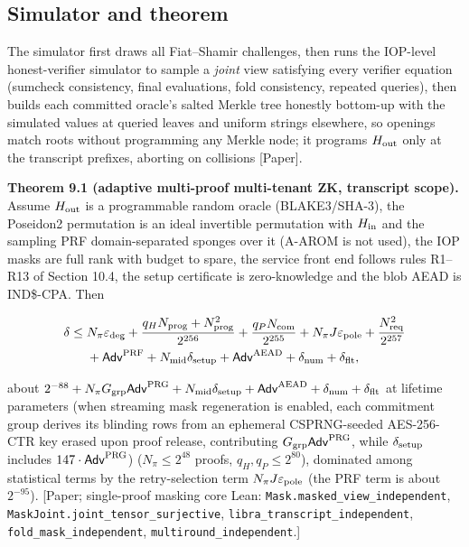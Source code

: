 \documentclass[10pt]{article}
\begin{document}
\subsection{Simulator and theorem}
The simulator first draws all Fiat--Shamir challenges, then runs the IOP-level honest-verifier simulator to sample a \emph{joint} view satisfying every verifier equation (sumcheck consistency, final evaluations, fold consistency, repeated queries), then builds each committed oracle's salted Merkle tree honestly bottom-up with the simulated values at queried leaves and uniform strings elsewhere, so openings match roots without programming any Merkle node; it programs $H_{\rm out}$ only at the transcript prefixes, aborting on collisions [Paper].

\textbf{Theorem 9.1 (adaptive multi-proof multi-tenant ZK, transcript scope).} Assume $H_{\rm out}$ is a programmable random oracle (BLAKE3/SHA-3), the Poseidon2 permutation is an ideal invertible permutation with $H_{\rm in}$ and the sampling PRF domain-separated sponges over it (A-AROM is not used), the IOP masks are full rank with budget to spare, the service front end follows rules R1--R13 of Section 10.4, the setup certificate is zero-knowledge and the blob AEAD is IND\$-CPA. Then

\[\begin{aligned}\delta\le{}&N_\pi\varepsilon_{\rm deg}+\frac{q_HN_{\rm prog}+N_{\rm prog}^2}{2^{256}}+\frac{q_PN_{\rm com}}{2^{255}}+N_\pi J\varepsilon_{\rm pole}+\frac{N_{\rm req}^2}{2^{257}}\\&+\mathsf{Adv}^{\rm PRF}+N_{\rm mid}\delta_{\rm setup}+\mathsf{Adv}^{\rm AEAD}+\delta_{\rm num}+\delta_{\rm flt},\end{aligned}\]

about $2^{-88}+N_\pi G_{\rm grp}\mathsf{Adv}^{\rm PRG}+N_{\rm mid}\delta_{\rm setup}+\mathsf{Adv}^{\rm AEAD}+\delta_{\rm num}+\delta_{\rm flt}$ at lifetime parameters (when streaming mask regeneration is enabled, each commitment group derives its blinding rows from an ephemeral CSPRNG-seeded AES-256-CTR key erased upon proof release, contributing $G_{\rm grp}\mathsf{Adv}^{\rm PRG}$, while $\delta_{\rm setup}$ includes $147\cdot\mathsf{Adv}^{\rm PRG}$) ($N_\pi\le2^{48}$ proofs, $q_H,q_P\le2^{80}$), dominated among statistical terms by the retry-selection term $N_\pi J\varepsilon_{\rm pole}$ (the PRF term is about $2^{-95}$). [Paper; single-proof masking core Lean: \texttt{Mask.\allowbreak{}masked\_\allowbreak{}view\_\allowbreak{}independent}, \texttt{MaskJoint.\allowbreak{}joint\_\allowbreak{}tensor\_\allowbreak{}surjective}, \texttt{libra\_\allowbreak{}transcript\_\allowbreak{}independent}, \texttt{fold\_\allowbreak{}mask\_\allowbreak{}independent}, \texttt{multiround\_\allowbreak{}independent}.]
\end{document}
